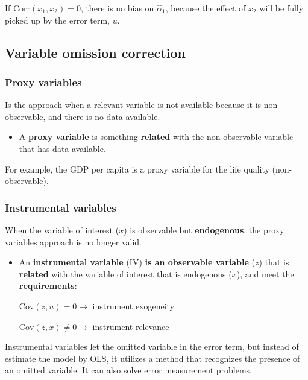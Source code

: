 \documentclass[10pt, a4paper, landscape]{article}
\newcommand{\Cov}{\mathrm{Cov}}
\newcommand{\Corr}{\mathrm{Corr}}
\begin{document}
\begin{multicols}{3}
		If $\Corr(x_{1}, x_{2}) = 0$, there is no bias on $\hat{\alpha}_{1}$, because the effect of $x_{2}$ will be fully picked up by the error term, $u$.
		
		\columnbreak
		
		\subsection*{Variable omission correction}
		
		\subsubsection*{Proxy variables}
		
		Is the approach when a relevant variable is not available because it is non-observable, and there is no data available.
		
		\begin{itemize}[leftmargin=*]
			\item A \textbf{proxy variable} is something \textbf{related} with the non-observable variable that has data available.
		\end{itemize}
		
		For example, the GDP per capita is a proxy variable for the life quality (non-observable).
		
		\subsubsection*{Instrumental variables}
		
		When the variable of interest ($x$) is observable but \textbf{endogenous}, the proxy variables approach is no longer valid.
		
		\begin{itemize}[leftmargin=*]
			\item An \textbf{instrumental variable} (IV) \textbf{is an observable variable} ($z$) that is \textbf{related} with the variable of interest that is endogenous ($x$), and meet the \textbf{requirements}:
			
			\begin{center}
				$\Cov(z, u) = 0 \rightarrow$ instrument exogeneity
				
				$\Cov(z, x) \neq 0 \rightarrow$ instrument relevance
			\end{center}
		\end{itemize}
		
		Instrumental variables let the omitted variable in the error term, but instead of estimate the model by OLS, it utilizes a method that recognizes the presence of an omitted variable. It can also solve error measurement problems.
		

\end{multicols}
\end{document}
